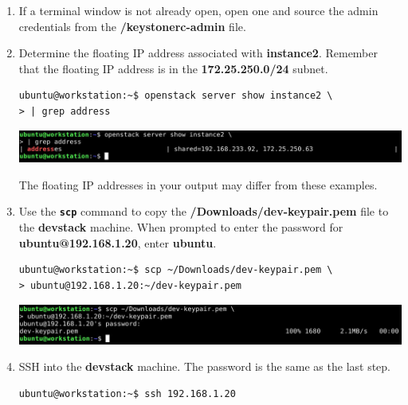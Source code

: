 \documentclass[letterpaper, 12pt]{article}
\begin{document}
\begin{enumerate}
    \item If a terminal window is not already open, open one and source the admin credentials from the 
    \textbf{\texttildemid/keystonerc-admin} file.

    \item Determine the floating IP address associated with \textbf{instance2}. Remember that the floating IP address is
    in the \textbf{172.25.250.0/24} subnet.
\begin{lstlisting}
ubuntu@workstation:~$ openstack server show instance2 \
> | grep address
\end{lstlisting}

    \begin{center}
        \includegraphics[width=\linewidth]{images/part2/step2.png}
    \end{center}

    \begin{notebox}{}
        The floating IP addresses in your output may differ from these examples.
    \end{notebox}

    \item Use the \textbf{\texttt{scp}} command to copy the \textbf{\texttildemid/Downloads/dev-keypair.pem} file to
    the \textbf{devstack} machine. When prompted to enter the password for \textbf{ubuntu@192.168.1.20}, enter
    \textbf{ubuntu}.
\begin{lstlisting}
ubuntu@workstation:~$ scp ~/Downloads/dev-keypair.pem \
> ubuntu@192.168.1.20:~/dev-keypair.pem
\end{lstlisting}

    \begin{center}
        \includegraphics[width=\linewidth]{images/part2/step3.png}
    \end{center}

    \item SSH into the \textbf{devstack} machine. The password is the same as the last step.
\begin{lstlisting}
ubuntu@workstation:~$ ssh 192.168.1.20
\end{lstlisting}


\end{enumerate}
\end{document}
